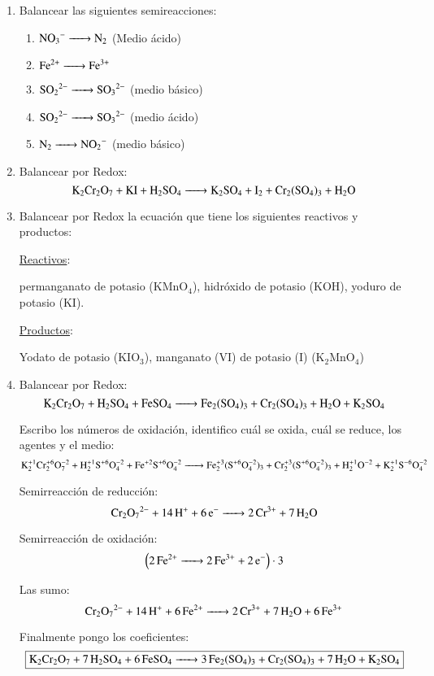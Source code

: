 \begin{enumerate}
\item Balancear las siguientes semireacciones:
\begin{enumerate}
    \item $\ce{ NO_3^- -> N_2 }$ (Medio ácido)
    \item $\ce{ Fe^{2+} -> Fe^{3+} }$
    \item $\ce{ SO_2^{\;2-} -> SO_3^{\;2-} }$ (medio básico)
    \item $\ce{ SO_2^{\;2-} -> SO_3^{\;2-} }$ (medio ácido)
    \item $\ce{ N_2 -> NO_2^- }$ (medio básico)
\end{enumerate}


\item Balancear por Redox:
$$\ce{K2Cr2O7 + KI + H2SO4 ->
K2SO4 + I2 + Cr2(SO4)3 + H2O}$$


\item Balancear por Redox la ecuación que tiene los siguientes reactivos y productos:

\underline{Reactivos}:

permanganato de potasio (KMnO$_4$), hidróxido de potasio (KOH), yoduro de potasio (KI).

\skipline
\underline{Productos}:

Yodato de potasio (KIO$_3$), manganato (VI) de potasio (I) (K$_2$MnO$_4$)


\newpage
\item Balancear por Redox:
$$
\ce{
    K2Cr2O7 + H2SO4 + FeSO4 ->
    Fe2(SO4)3 + Cr2(SO4)3 + H2O + K2SO4
}
$$

Escribo los números de oxidación, identifico cuál se oxida, cuál se reduce, los agentes y el medio:
$$
\ce{
    K^{+1}2Cr^{+6}2O^{-2}7 + H^{+1}2S^{+6}O^{-2}4 + Fe^{+2}S^{+6}O^{-2}4 ->
    Fe^{+3}2(S^{+6}O^{-2}4)3 + Cr^{+3}2(S^{+6}O^{-2}4)3 + H^{+1}2O^{-2} + K^{+1}2S^{-6}O^{-2}4
}
$$


\begin{multicols}{2}
Semirreacción de reducción:
$$\ce{Cr2O7^{2-} + 14H^+ + 6e^- ->
2Cr^{3+} + 7H2O}$$

Semirreacción de oxidación:
$$\left( \ce{2Fe^{2+} ->
2Fe^{3+} + 2e^-} \right) \cdot 3$$
\end{multicols}

Las sumo:
$$\ce{
    Cr2O7^{2-} + 14H^+ + 6Fe^{2+} ->
    2Cr^{3+} + 7 H2O + 6Fe^{3+}
}$$

Finalmente pongo los coeficientes:
$$\fbox{\ce{
    K2Cr2O7 + 7H2SO4 + 6FeSO4 ->
    3Fe2(SO4)3 + Cr2(SO4)3 + 7H2O + K2SO4
}}$$

\end{enumerate}